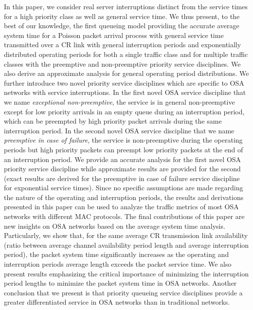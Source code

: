 \documentclass[11pt,journal,oneside,onecolumn,draftclsnofoot]{IEEEtran}
\begin{document}
In this paper, we consider real server interruptions distinct from the service times for a high priority class as well as general service time. 
We thus present, to the best of our knowledge, the first queueing model providing the accurate average system time for a Poisson packet arrival process with general service time transmitted over a CR link with general interruption periods and exponentially distributed operating periods for both a single traffic class and for multiple traffic classes with the preemptive and non-preemptive priority service disciplines. We also derive an approximate analysis for general operating period distributions. We further introduce two novel priority service disciplines which are specific to OSA networks with service interruptions. In the first novel OSA service discipline that we name \emph{exceptional non-preemptive}, the service is in general non-preemptive except for low priority arrivals in an empty queue during an interruption period, which can be preempted by high priority packet arrivals during the same interruption period. In the second novel OSA service discipline that we name \emph{preemptive in case of failure}, the service is non-preemptive during the operating periods but high priority packets can preempt low priority packets at the end of an interruption period. We provide an accurate analysis for the first novel OSA priority service discipline while approximate results are provided for the second (exact results are derived for the preemptive in case of failure service discipline for exponential service times).
Since no specific assumptions are made regarding the nature of the operating and interruption periods, the results and derivations presented in this paper can be used to analyze the traffic metrics of most OSA networks with different MAC protocols.
The final contributions of this paper are new insights on OSA networks based on the average system time analysis. Particularly, we show that, for the same average CR transmission link availability (ratio between average channel availability period length and average interruption period), the packet system time significantly increases as the operating and interruption periods average length exceeds the packet service time. We also present results emphasizing the critical importance of minimizing the interruption period lengths to minimize the packet system time in OSA networks. Another conclusion that we present is that priority queueing service disciplines provide a greater differentiated service in OSA networks than in traditional networks.
\end{document}
